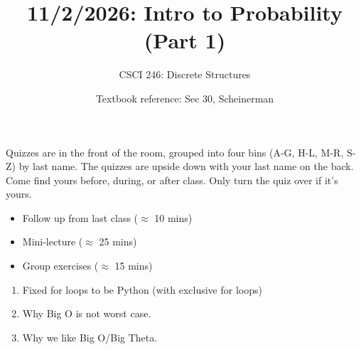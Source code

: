 \documentclass[10pt]{beamer}
\begin{document}





\title{11/2/2026: Intro to Probability (Part 1)}
\author{CSCI 246: Discrete Structures}
\date{Textbook reference: Sec 30, Scheinerman}

\begin{frame}
    \titlepage 
\end{frame}


\begin{frame}
\footnotesize 
\begin{mygreenbox}[title=Graded Quiz Pickup]
Quizzes are in the front of the room, grouped into four bins (A-G, H-L, M-R, S-Z) by last name. The quizzes are upside down with your last name on the back. Come find yours before, during, or after class.  Only turn the quiz over if it's yours.
\end{mygreenbox} 
\vfill 


\vfill 


\begin{myyellowbox}[title=Today's Agenda]
\begin{itemize}
	\item Follow up from last class ($\approx$ 10 mins)
	\item Mini-lecture ($\approx$ 25 mins)
	\item Group exercises ($\approx$ 15 mins)
\end{itemize}
\end{myyellowbox}
\vfill 


\begin{myredbox}[title=Follow-up from last class]
\begin{enumerate}
\item Fixed for loops to be Python (with exclusive for loops)   
\item Why Big O is not worst case.
\item Why we like Big O/Big Theta.
\end{enumerate}
\end{myredbox}


 
\end{frame}
\end{document}
